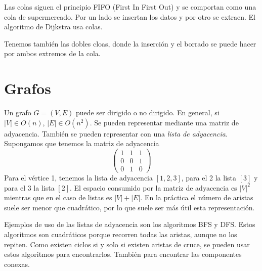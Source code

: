 \documentclass[AL.tex]{subfiles}
\begin{document}
Las colas siguen el principio FIFO (First In First Out) y se comportan como una cola de supermercado. Por un lado se insertan los datos y por otro se extraen. El algoritmo de Dijkstra usa colas. 

Tenemos también las dobles cloas, donde la inserción y el borrado se puede hacer por ambos extremos de la cola. 

\section{Grafos}
Un grafo $G=(V,E)$ puede ser dirigido o no dirigido. En general, si $|V|\in O(n)$, $|E|\in O(n^2)$. Se pueden representar mediante una matriz de adyacencia. También se pueden representar con una \emph{lista de adyacencia}. Supongamos que tenemos la matriz de adyacencia 
$$\begin{pmatrix}
1 & 1 & 1\\
0 & 0 & 1\\
0 & 1 & 0
\end{pmatrix}$$
Para el vértice 1, tenemos la lista de adyacencia $[1,2,3]$, para el 2 la lista $[3]$ y para el 3 la lista $[2]$. El espacio consumido por la matriz de adyacencia es $|V|^2$ mientras que en el caso de listas es $|V|+|E|$. En la práctica el número de aristas suele ser menor que cuadrático, por lo que suele ser más útil esta representación. 

Ejemplos de uso de las listas de adyacencia son los algoritmos BFS y DFS. Estos algoritmos son cuadráticos porque recorren todas las aristas, aunque no los repiten. Como existen ciclos si y solo si existen aristas de cruce, se pueden usar estos algoritmos para encontrarlos. También para encontrar las componentes conexas.
\end{document}
